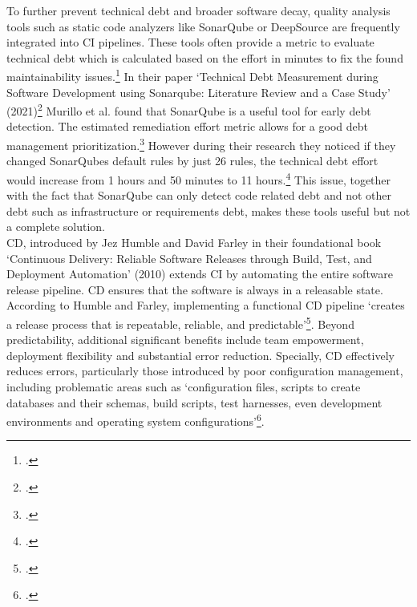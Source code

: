 To further prevent technical debt and broader software decay, quality analysis tools such as static code analyzers like SonarQube or DeepSource are frequently integrated into
\ac{CI} pipelines. These tools often provide a metric to evaluate technical debt which is calculated based on the effort in minutes to fix the found maintainability issues.\footcite{sonarqubeUnderstandingMeasuresMetrics2025}
In their paper `Technical Debt Measurement during Software Development using Sonarqube: Literature Review and a Case Study' (2021)\footcite{murilloTechnicalDebtMeasurement2021}
Murillo et al. found that SonarQube is a useful tool for early debt detection. The estimated remediation effort metric allows for a good debt management prioritization.\footcite[5]{murilloTechnicalDebtMeasurement2021}
However during their research they noticed if they changed SonarQubes default rules by just 26 rules, the technical debt effort would increase from
1 hours and 50 minutes to 11 hours.\footcite[4]{murilloTechnicalDebtMeasurement2021} This issue, together with the fact that SonarQube can only detect code related debt and not other debt such as
infrastructure or requirements debt, makes these tools useful but not a complete solution.\\

\ac{CD}, introduced by Jez Humble and David Farley in their foundational book `Continuous Delivery: Reliable Software Releases through Build, Test, and Deployment Automation' (2010)
extends \ac{CI} by automating the entire software release pipeline. \ac{CD} ensures that the software is always in a releasable state.
According to Humble and Farley, implementing a functional \ac{CD} pipeline `creates a release process that is repeatable, reliable, and predictable'\footcite[17]{humbleContinuousDeliveryReliable2010}.
Beyond predictability, additional significant benefits include team empowerment, deployment flexibility and substantial error reduction.
Specially, \ac{CD} effectively reduces errors, particularly those introduced by poor configuration management, including problematic areas such as
`configuration files, scripts to create databases and their schemas, build scripts, test harnesses, even development environments and operating system configurations'\footcite[19]{humbleContinuousDeliveryReliable2010}.\\

